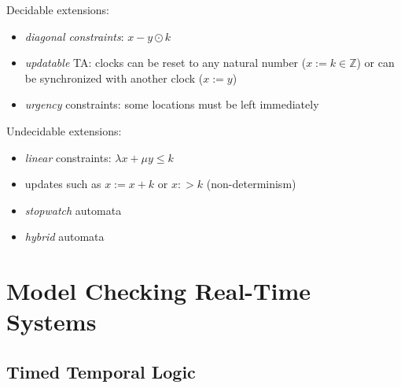 \documentclass{beamer}
\theoremstyle{definition}
\begin{document}
\begin{frame}
  \small
  Decidable extensions:
  \begin{itemize}
    \item \emph{diagonal constraints}: $x - y \odot k$
    \item \emph{updatable} TA: clocks can be reset to any natural number ($x := k \in \mathbb{Z}$) or can be synchronized with another clock ($x := y$)
    \item \emph{urgency} constraints: some locations must be left immediately
  \end{itemize}
  \vfill
  Undecidable extensions:
  \begin{itemize}
    \item \emph{linear} constraints: $\lambda x + \mu y \leq k$
    \item updates such as $x := x + k$ or $x :> k$ (non-determinism)
    \item \emph{stopwatch} automata
    \item \emph{hybrid} automata

  \end{itemize}
\end{frame}

\section{Model Checking Real-Time Systems}
\subsection{Timed Temporal Logic}

\begin{frame}
\end{frame}
\end{document}
